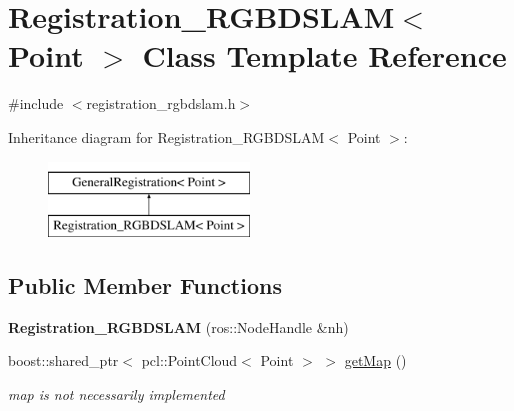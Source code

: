 \hypertarget{classRegistration__RGBDSLAM}{
\section{Registration\_\-RGBDSLAM$<$ Point $>$ Class Template Reference}
\label{classRegistration__RGBDSLAM}
}


{\ttfamily \#include $<$registration\_\-rgbdslam.h$>$}

Inheritance diagram for Registration\_\-RGBDSLAM$<$ Point $>$:\begin{figure}[H]
\begin{center}
\leavevmode
\includegraphics[height=2.000000cm]{classRegistration__RGBDSLAM}
\end{center}
\end{figure}
\subsection*{Public Member Functions}
\begin{DoxyCompactItemize}
\item 
\hypertarget{classRegistration__RGBDSLAM_ab2bfaca24dc1d7c02bb512c4ead4d939}{
{\bfseries Registration\_\-RGBDSLAM} (ros::NodeHandle \&nh)}
\label{classRegistration__RGBDSLAM_ab2bfaca24dc1d7c02bb512c4ead4d939}

\item 
\hypertarget{classRegistration__RGBDSLAM_a119c92ef6613c9bea7d7507559974178}{
boost::shared\_\-ptr$<$ pcl::PointCloud$<$ Point $>$ $>$ \hyperlink{classRegistration__RGBDSLAM_a119c92ef6613c9bea7d7507559974178}{getMap} ()}
\label{classRegistration__RGBDSLAM_a119c92ef6613c9bea7d7507559974178}

\begin{DoxyCompactList}\small\item\em map is not necessarily implemented \item\end{DoxyCompactList}\end{DoxyCompactItemize}
